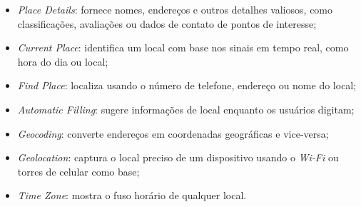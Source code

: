 \begin{itemize}
    \item \textit{Place Details}: fornece nomes, endereços e outros detalhes valiosos, como classificações, avaliações ou dados de contato de pontos de interesse;
    \item \textit{Current Place}: identifica um local com base nos sinais em tempo real, como hora do dia ou local;
    \item \textit{Find Place}: localiza usando o número de telefone, endereço ou nome do local;
    \item \textit{Automatic Filling}: sugere informações de local enquanto os usuários digitam;
    \item \textit{Geocoding}: converte endereços em coordenadas geográficas e vice-versa;
    \item \textit{Geolocation}: captura o local preciso de um dispositivo usando o \textit{Wi-Fi} ou torres de celular como base;
    \item \textit{Time Zone}: mostra o fuso horário de qualquer local.
\end{itemize}